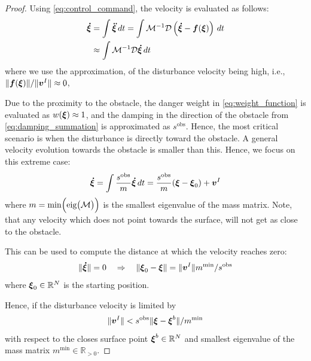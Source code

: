 \begin{proof}
Using \eqref{eq:control_command}, the velocity is evaluated as follows:
\begin{equation}
\begin{split}
    \boldsymbol{\dot \xi} & = \int \boldsymbol{\ddot \xi} \, dt 
    = \int \mathcal{M}^{-1} \mathcal{D}  \left( \boldsymbol{\dot \xi} - \boldsymbol{f}(\boldsymbol{\xi}) \right) \, dt \\
    & \approx \int \mathcal{M}^{-1} \mathcal{D} \boldsymbol{\dot \xi} \, dt
\end{split}
\end{equation}
where we use the approximation, of the disturbance velocity being high, i.e., $\| \boldsymbol{f}(\boldsymbol{\xi}) \| / \|\boldsymbol{v}^I \| \approx 0 $, 

Due to the proximity to the obstacle, the danger weight in \eqref{eq:weight_function} is evaluated as $w(\boldsymbol{\xi}) \approx 1$, and the damping in the direction of the obstacle from \eqref{eq:damping_summation} is approximated as $s^{\mathrm{obs}}$. 
Hence, the most critical scenario is when the disturbance is directly toward the obstacle. A general velocity evolution towards the obstacle is smaller than this.
Hence, we focus on this extreme case:
\begin{equation}
    \vecs{\dot \xi} = \int \frac{s^{\mathrm{obs}}}{m} \vecs{ \dot \xi} \, dt = \frac{s^{\mathrm{obs}}}{m} (\vecs{\xi} - \vecs \xi_0)  + \vecs v^I \label{eq:velocity_with_control}
\end{equation}
where $m = \min \Bigl(\text{eig} \bigl(\mathcal{M} \bigr) \Bigr)$ is the smallest eigenvalue of the mass matrix. Note, that any velocity which does not point towards the surface, will not get as close to the obstacle.

This can be used to compute the distance at which the velocity reaches zero:
\begin{equation}
    \| \boldsymbol{\dot \xi} \| = 0
    \quad \Rightarrow \quad
    \|\boldsymbol{\xi}_0 - \boldsymbol{\xi} \| = \| \boldsymbol{v}^I \| {m^{\mathrm{min}}} / {s^{\mathrm{obs}}} 
\end{equation}
where $\boldsymbol{\xi}_0 \in \mathbb{R}^N $ is the starting position. 

Hence, if the disturbance velocity is limited by 
\begin{equation}
    \| \boldsymbol{v}^I \| < s^{\mathrm{obs}} \| \boldsymbol{\xi} - \boldsymbol{\xi}^b \| / m^{\mathrm{min}}
\end{equation}
with respect to the closes surface point $\boldsymbol{\xi}^b \in \mathbb{R}^N$ and smallest eigenvalue of the mass matrix $m^{\mathrm{min}} \in \mathbb{R}_{>0}$.
\end{proof}

